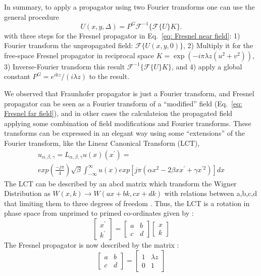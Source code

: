 \documentclass{iucr}              %
\newcommand{\ingreen}[1]{{\color{green}#1}}
\begin{document}
In summary, to apply a propagator using two Fourier transforms one can use the general procedure
\begin{equation}
\label{eq: Fresnel propagation in convolution form}
U(x, y, \Delta) = P^G \mathcal{F}^{-1}\Big\{\mathcal{F}\big\{U \big\} K \Big\}.
\end{equation}
with three steps for the Fresnel propagator in Eq.~\ref{eq: Fresnel near field}: 1) Fourier transform the unpropagated field: $\mathcal{F}\big\{U(x,y,0)\big\}$, 2) Multiply it for the free-space Fresnel propagator in reciprocal space
$ K=\exp(-i \pi \lambda z (u^2+v^2))$, 3) Inverse-Fourier transform this result $\mathcal{F}^{-1}\Big\{\mathcal{F}\big\{U \big\} K \Big\}$, and 4) apply a global constant $P^G = {e^{i k z}}/(i \lambda z)$ to the result. 


We observed that Fraunhofer propagator is just a Fourier transform, and Fresnel propagator can be seen as a Fourier transform of a ``modified'' field (Eq.~\ref{eq: Fresnel far field}), and in other cases the calculateion the propagated field applying some combination of field modifications and Fourier transforms. These transforms can be expressed in an elegant way using some ``extensions'' of the Fourier transform, like the Linear Canonical Transform (LCT),
\begin{multline*}
    	u_{\alpha, \beta, \gamma} = L_{\alpha, \beta, \gamma}{u(x)}(x^{'}) = \\ exp(\frac{-j\pi}{4})\sqrt{\beta}\int_{-\infty}^{\infty}u(x)exp[j\pi(\alpha x^{2} - 2\beta xx^{'} + \gamma x^{'2})]dx 
\end{multline*}
The LCT can be described by an abcd matrix which transform the Wigner Distribution as $W(x,k) \rightarrow W(ax+bk,cx+dk)$ with relations between a,b,c,d that limiting them to three degrees of freedom \cite{Hennelly05}. 
Thus, the LCT is a rotation in phase space from unprimed to primed co-ordinates given by \cite{Hennelly05} :
 \begin{equation}
	\begin{bmatrix}
	x^{'}\\
	k^{'}
	\end{bmatrix} = 
	\begin{bmatrix}
	a & b \\
	c & d
	\end{bmatrix}
	\begin{bmatrix}
	x\\
	k
	\end{bmatrix}
\end{equation}
The Fresnel propagator is now described by the matrix \cite{Hennelly05} : 
\begin{equation}
    	\begin{bmatrix}
		a & b \\
		c & d
	\end{bmatrix}
	=
	\begin{bmatrix}
	1 & \lambda z \\
	0 & 1
	\end{bmatrix}	
\end{equation}
\end{document}
